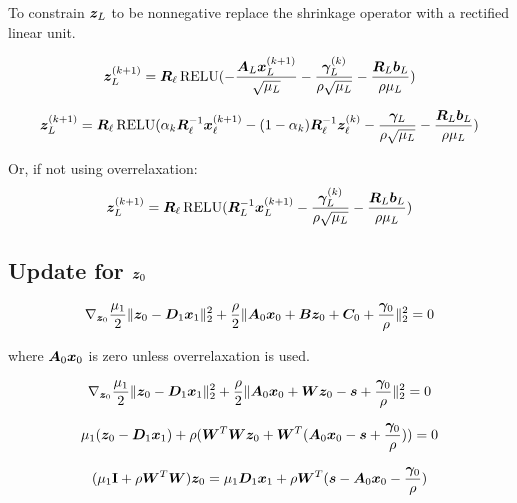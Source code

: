 \documentclass{article}
\begin{document}
To constrain $\bm{z}_L$ to be nonnegative replace the shrinkage operator with a rectified linear unit.

\begin{equation}
\bm{z}_L^{(k + 1)} = \bm{R}_{\ell}\operatorname{RELU}(-\frac{\bm{A}_L\bm{x}_L^{(k + 1)}}{\sqrt{\mu_L}} - \frac{\bm{\gamma}_L^{(k)}}{\rho\sqrt{\mu_L}} - \frac{\bm{R}_L\bm{b}_L}{\rho\mu_L})
\end{equation}

\begin{equation}
\bm{z}_L^{(k + 1)} = \bm{R}_{\ell}\operatorname{RELU}(\alpha_k\bm{R}_{\ell}^{-1}\bm{x}_{\ell}^{(k + 1)} - (1 - \alpha_k)\bm{R}_{\ell}^{-1}\bm{z}_{\ell}^{(k)} - \frac{\bm{\gamma}_L}{\rho\sqrt{\mu_L}} - \frac{\bm{R}_L\bm{b}_L}{\rho\mu_L})
\end{equation}



Or, if not using overrelaxation:
\begin{equation}
\bm{z}_L^{(k + 1)} = \bm{R}_{\ell}\operatorname{RELU}(\bm{R}_L^{-1}\bm{x}_L^{(k + 1)} - \frac{\bm{\gamma}_L^{(k)}}{\rho\sqrt{\mu_L}} - \frac{\bm{R}_L\bm{b}_L}{\rho\mu_L})
\end{equation}

\subsection{Update for $\bm{z}_0$}

\begin{equation}
\nabla_{\bm{z}_0} \frac{\mu_1}{2}\|\bm{z}_0 - \bm{D}_1\bm{x}_1\|_2^2 + \frac{\rho}{2}\|\bm{A}_0\bm{x}_0 + \bm{B}\bm{z}_0 + \bm{C}_0 + \frac{\bm{\gamma}_0}{\rho}\|_2^2 = 0
\end{equation}

where $\bm{A}_0\bm{x}_0$ is zero unless overrelaxation is used.

\begin{equation}
\nabla_{\bm{z}_0} \frac{\mu_1}{2}\|\bm{z}_0 - \bm{D}_1\bm{x}_1\|_2^2 + \frac{\rho}{2}\|\bm{A}_0\bm{x}_0 + \bm{W}\bm{z}_0 - \bm{s} + \frac{\bm{\gamma}_0}{\rho}\|_2^2 = 0
\end{equation}

\begin{equation}
\mu_1(\bm{z}_0 - \bm{D}_1\bm{x}_1) + \rho(\bm{W}^T\bm{W}\bm{z}_0 + \bm{W}^T(\bm{A}_0\bm{x}_0 - \bm{s} + \frac{\bm{\gamma}_0}{\rho})) = 0
\end{equation}

\begin{equation}
(\mu_1{\bf I} + \rho\bm{W}^T\bm{W})\bm{z}_0 = \mu_1\bm{D}_1\bm{x}_1 + \rho\bm{W}^T(\bm{s} - \bm{A}_0\bm{x}_0 - \frac{\bm{\gamma}_0}{\rho})
\end{equation}
\end{document}
